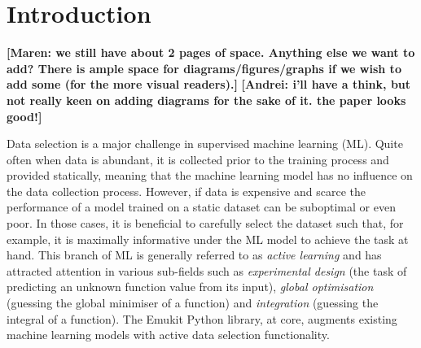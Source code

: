 \newcommand{\maren}[1]{{\color{cyan} \textbf{[Maren: #1]}}}
\newcommand{\andrei}[1]{{\color{red} \textbf{[Andrei: #1]}}}
\newcommand{\rev}[1]{{\color{blue} \textbf{#1}}}

\section{Introduction}\label{introduction}

\maren{we still have about 2 pages of space. Anything else we want to add? There is ample space for diagrams/figures/graphs if we wish to add some (for the more visual readers).}\andrei{i'll have a think, but not really keen on adding diagrams for the sake of it. the paper looks good!}

Data selection is a major challenge in supervised machine learning (ML). Quite often when data is abundant, it is collected prior to the training process and provided statically, meaning that the machine learning model has no influence on the data collection process. However, if data is expensive and scarce the performance of a model trained on a static dataset can be suboptimal or even poor. In those cases, it is beneficial to carefully select the dataset such that, for example, it is maximally informative under the ML model to achieve the task at hand. This branch of ML is generally referred to as \emph{active learning} \cite{Settles2009} and has attracted attention in various sub-fields such as \emph{experimental design} (the task of predicting an unknown function value from its input), \emph{global optimisation} (guessing the global minimiser of a function) and \emph{integration} (guessing the integral of a function).
The Emukit Python library, at core, augments existing machine learning models with active data selection functionality.

